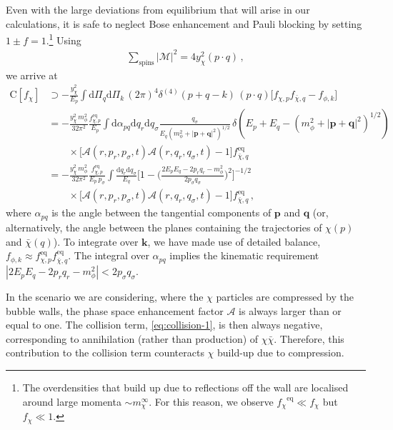\documentclass[
onecolumn, %
11pt, %
tightenlines,
superscriptaddress, %
nofootinbib, %
preprintnumbers, %
prd %
]{revtex4-1}
\renewcommand{\vec}[1]{{\boldsymbol{#1}}}
\newcommand{\upd}{\mathrm d}                                          %
\newcommand{\ba}[1]{\bigg(#1\bigg)}                                   %
\newcommand{\f}{\ensuremath{f_\chi}\xspace}
\newcommand{\A}{\ensuremath{\mathcal A}\xspace}
\newcommand{\feq}{\ensuremath{\f^\text{eq}}\xspace}
\begin{document}
Even with the large deviations from equilibrium that will arise in our calculations, it is safe to neglect Bose enhancement and Pauli blocking by setting $1 \pm f = 1$.\footnote{The overdensities that build up due to reflections off the wall are localised around large momenta $\sim m_\chi^\infty$. For this reason, we observe $\feq \ll \f$ but $\f \ll 1$.} Using
%
\begin{align}
    \sum_\text{spins}|\mathcal M|^2 = 4y_\chi^2(p\cdot q)\,,
\end{align}
%
we arrive at 
%
\begin{align}
    \boldsymbol{\mathrm C}[f_\chi] &\supset
        - \frac{y_\chi^2}{E_p} \int \upd\Pi_q \upd\Pi_k  \,
        (2\pi)^4 \delta^{(4)}(p+q-k) \, (p\cdot q) \big[ f_{\chi,p}f_{\bar\chi,q}  - f_{\phi,k} \big] \\
        &=- \frac{y_\chi^2\,m^2_\phi}{32\pi^2} \frac{f^\text{eq}_{\chi,p}}{E_{p}}\int\upd \alpha_{pq} \upd q_r \upd q_\sigma \frac{q_\sigma}{E_{q}(m_\phi^2+|\vec p+\vec q|^2)^{1/2}} \,
        \delta(E_{p}+E_{q}-(m_\phi^2+|\vec p+\vec q|^2)^{1/2}) \\
        &\qquad\times \big[ \A(r,p_r,p_\sigma,t) \A(r,q_r,q_\sigma,t) - 1 \big]f^\text{eq}_{\bar\chi,q}\nonumber\\
        &=- \frac{y_\chi^2\,m^2_\phi}{32\pi^2}\frac{f^\text{eq}_{\chi,p}}{E_{p}\,p_\sigma} \int \frac{\upd q_r \upd q_\sigma}{E_{q}}\Bigg[1-\ba{\frac{2E_{p} E_{q}-2p_rq_r-m_\phi^2}{2 p_\sigma q_\sigma}}^{\!2}\Bigg]^{-1/2} \nonumber\\
\label{eq:collision-1}
        &\qquad\times\big[ \A(r,p_r,p_\sigma,t) \A(r,q_r,q_\sigma,t) - 1 \big]f^\text{eq}_{\bar\chi,q}\,,
\end{align}
%
where $\alpha_{pq}$ is the angle between the tangential components of $\vec p$ and $\vec q$ (or, alternatively, the angle between the planes containing the trajectories of $\chi(p)$ and $\bar\chi(q)$). To integrate over $\vec k$, we have made use of detailed balance, $f_{\phi,k}\approx f^\text{eq}_{\chi,p}f^\text{eq}_{\bar\chi,q}$. The integral over $\alpha_{pq}$ implies the kinematic requirement $|2E_{p}E_{q}-2p_rq_r-m_\phi^2|<2p_\sigma q_\sigma$.

In the scenario we are considering, where the $\chi$ particles are compressed by the bubble walls, the phase space enhancement factor \A is always larger than or equal to one. The collision term, \cref{eq:collision-1}, is then always negative, corresponding to annihilation (rather than production) of $\chi \bar\chi$. Therefore, this contribution to the collision term counteracts $\chi$ build-up due to compression.
\end{document}
